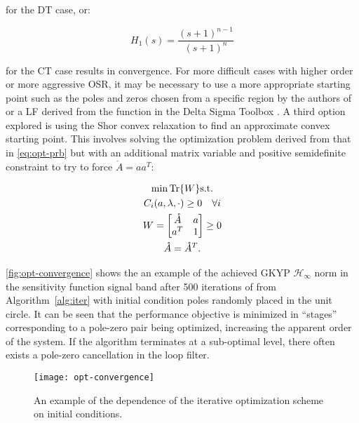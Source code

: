 for the \gls{DT} case, or:

\begin{equation*}
	H_1(s) = \frac{(s + 1)^{n-1}}{(s + 1)^n}
\end{equation*}

for the \gls{CT} case results in convergence. For more difficult cases with higher order or more aggressive \gls{OSR}, it may be necessary to use a more appropriate starting point such as the poles and zeros chosen from a specific region by the authors of \cite[Fig. 2]{Li2014} or a \gls{LF} derived from the  function in the Delta Sigma Toolbox \cite[Appx. B]{Schreier1997}. A third option explored is using the Shor convex relaxation \cite{Boyd1997} to find an approximate convex starting point. This involves solving the optimization problem derived from that in \autoref{eq:opt-prb} but with an additional matrix variable and positive semidefinite constraint to try to force $\mathring{A} = aa^T$:

\begin{equation*}
	\begin{gathered}
		\min \operatorname{Tr}\{W\} \mathrm{ s.t.} \\
		C_i(a, \lambda, \cdot) \geq 0 \quad \forall i \\
		W = 
		\begin{bmatrix}
			\mathring{A} & a \\
			a^T & 1
		\end{bmatrix} \geq 0 \\
		\mathring{A} = \mathring{A}^T.
	\end{gathered}
\end{equation*}

\autoref{fig:opt-convergence} shows the an example of the achieved \gls{GKYP} $\mathcal{H}_\infty$ norm in the sensitivity function signal band after 500 iterations of   from Algorithm~\ref{alg:iter} with initial condition poles randomly placed in the unit circle. It can be seen that the performance objective is minimized in ``stages'' corresponding to a pole-zero pair being optimized, increasing the apparent order of the system. If the algorithm terminates at a sub-optimal level, there often exists a pole-zero cancellation in the loop filter.

\begin{figure}
	\centering
	\texttt{[image: opt-convergence]}
	\caption{An example of the dependence of the iterative optimization scheme on initial conditions.} \label{fig:opt-convergence}
\end{figure}